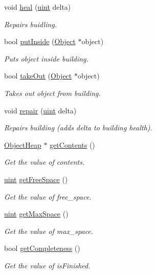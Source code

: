 \begin{DoxyCompactItemize}
void \hyperlink{classBuilding_a4266475915167761e483886535382f90}{heal} (\hyperlink{BasicTypes_8h_a91ad9478d81a7aaf2593e8d9c3d06a14}{uint} delta)
\begin{DoxyCompactList}\small\item\em Repairs buidling. \end{DoxyCompactList}\item 
bool \hyperlink{classBuilding_a4c019de587cb657f2566cbb27623fc6f}{put\-Inside} (\hyperlink{classObject}{Object} $\ast$object)
\begin{DoxyCompactList}\small\item\em Puts object inside building. \end{DoxyCompactList}\item 
bool \hyperlink{classBuilding_a793d0afc39ccf187e0a749f93eecffe2}{take\-Out} (\hyperlink{classObject}{Object} $\ast$object)
\begin{DoxyCompactList}\small\item\em Takes out object from building. \end{DoxyCompactList}\item 
void \hyperlink{classBuilding_af5beff6811010a84af940243fab63041}{repair} (\hyperlink{BasicTypes_8h_a91ad9478d81a7aaf2593e8d9c3d06a14}{uint} delta)
\begin{DoxyCompactList}\small\item\em Repairs building (adds delta to building health). \end{DoxyCompactList}\item 
\hyperlink{classObjectHeap}{Object\-Heap} $\ast$ \hyperlink{classBuilding_aa2b2d6a6e7c8d55643613778fcabdd97}{get\-Contents} ()
\begin{DoxyCompactList}\small\item\em Get the value of contents. \end{DoxyCompactList}\item 
\hyperlink{BasicTypes_8h_a91ad9478d81a7aaf2593e8d9c3d06a14}{uint} \hyperlink{classBuilding_a112e8d1b75492e9cf4fef0468a64b19b}{get\-Free\-Space} ()
\begin{DoxyCompactList}\small\item\em Get the value of free\-\_\-space. \end{DoxyCompactList}\item 
\hyperlink{BasicTypes_8h_a91ad9478d81a7aaf2593e8d9c3d06a14}{uint} \hyperlink{classBuilding_ac37f23792d59ba27ba82dabe988752f6}{get\-Max\-Space} ()
\begin{DoxyCompactList}\small\item\em Get the value of max\-\_\-space. \end{DoxyCompactList}\item 
bool \hyperlink{classBuilding_a79aac1962bbd77d80fd6e1fe80abec88}{get\-Completeness} ()
\begin{DoxyCompactList}\small\item\em Get the value of is\-Finished. \end{DoxyCompactList}\end{DoxyCompactItemize}
